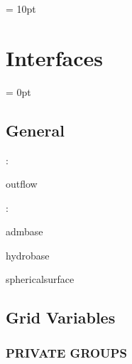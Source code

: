 \vspace{0.5cm}\parskip = 10pt 

\section{Interfaces} 


\parskip = 0pt

\vspace{3mm} \subsection*{General}

: 

outflow
\vspace{2mm}

: 

admbase

hydrobase

sphericalsurface
\vspace{2mm}
\subsection*{Grid Variables}
\vspace{5mm}\subsubsection{PRIVATE GROUPS}

\vspace{5mm}

